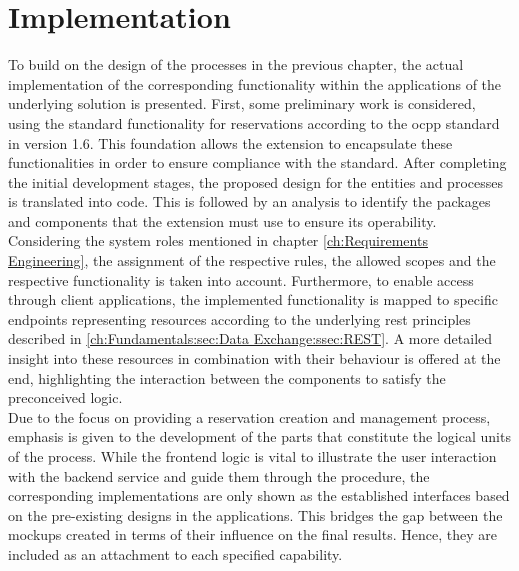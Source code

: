 
\chapter{Implementation}
\label{ch:Implementation}

To build on the design of the processes in the previous chapter, the actual implementation of the corresponding functionality within the applications of the underlying solution is presented.
First, some preliminary work is considered, using the standard functionality for reservations according to the \acrshort{ocpp} standard in version 1.6.
This foundation allows the extension to encapsulate these functionalities in order to ensure compliance with the standard.
After completing the initial development stages, the proposed design for the entities and processes is translated into code. This is followed by an analysis to identify the packages and components that the extension must use to ensure its operability.
Considering the system roles mentioned in chapter \ref{ch:Requirements Engineering}, the assignment of the respective rules, the allowed scopes and the respective functionality is taken into account.
Furthermore, to enable access through client applications, the implemented functionality is mapped to specific endpoints representing resources according to the underlying \acrshort{rest} principles described in \ref{ch:Fundamentals:sec:Data Exchange:ssec:REST}.
A more detailed insight into these resources in combination with their behaviour is offered at the end, highlighting the interaction between the components to satisfy the preconceived logic. \\
\noindent Due to the focus on providing a reservation creation and management process, emphasis is given to the development of the parts that constitute the logical units of the process. 
While the frontend logic is vital to illustrate the user interaction with the backend service and guide them through the procedure, the corresponding implementations are only shown as the established interfaces based on the pre-existing designs in the applications.
This bridges the gap between the mockups created in terms of their influence on the final results. Hence, they are included as an attachment to each specified capability. 

